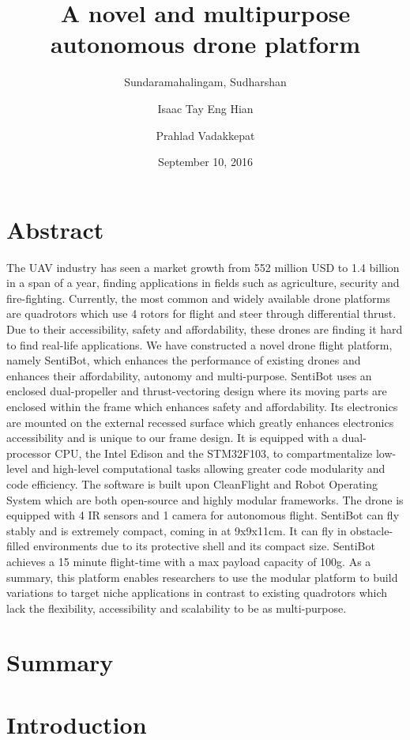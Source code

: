 \documentclass[12pt]{article}
\title{A novel and multipurpose autonomous drone platform}
\date{September 10, 2016}
\author{
	Sundaramahalingam, Sudharshan\\
	\and
	Isaac Tay Eng Hian\\
	\and
	Prahlad Vadakkepat
}
\begin{document}
\maketitle
{}
\newpage
{}

\section{Abstract}
The UAV industry has seen a market growth from 552 million USD to 1.4 billion in a span of a year, finding applications in fields such as agriculture, security and fire-fighting. Currently, the most common and widely available drone platforms are quadrotors which use 4 rotors for flight and steer through differential thrust. Due to their accessibility, safety and affordability, these drones are finding it hard to find real-life applications. We have constructed a novel drone flight platform, namely SentiBot, which enhances the performance of existing drones and enhances their affordability, autonomy and multi-purpose. SentiBot uses an enclosed dual-propeller and thrust-vectoring design where its moving parts are enclosed within the frame which enhances safety and affordability. Its electronics are mounted on the external recessed surface which greatly enhances electronics accessibility and is unique to our frame design. It is equipped with a dual-processor CPU, the Intel Edison and the STM32F103, to compartmentalize low-level and high-level computational tasks allowing greater code modularity and code efficiency. The software is built upon CleanFlight and Robot Operating System which are both open-source and highly modular frameworks. The drone is equipped with 4 IR sensors and 1 camera for autonomous flight. SentiBot can fly stably and is extremely compact, coming in at 9x9x11cm. It can fly in obstacle-filled environments due to its protective shell and its compact size. SentiBot achieves a 15 minute flight-time with a max payload capacity of 100g. As a summary, this platform enables researchers to use the modular platform to build variations to target niche applications in contrast to existing quadrotors which lack the flexibility, accessibility and scalability to be as multi-purpose. 

\newpage

\section{Summary}


\section{Introduction}
\end{document}
